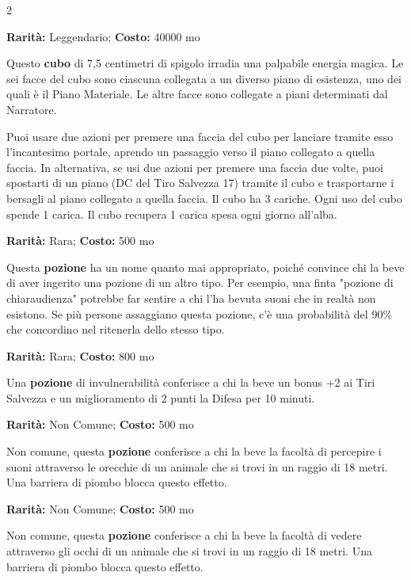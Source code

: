 \begin{multicols}{2}

\textbf{Rarità:} Leggendario; \textbf{Costo:} 40000 mo

Questo \textbf{cubo} di 7,5 centimetri di spigolo irradia una palpabile energia magica. Le sei facce del cubo sono ciascuna collegata a un diverso piano di esistenza, uno dei quali è il Piano Materiale. Le altre facce sono collegate a piani determinati dal Narratore.

Puoi usare due azioni per premere una faccia del cubo per lanciare tramite esso l'incantesimo portale, aprendo un passaggio verso il piano collegato a quella faccia. In alternativa, se usi due azioni per premere una faccia due volte, puoi spostarti di un piano (DC del Tiro Salvezza 17) tramite il cubo e trasportarne i bersagli al piano collegato a quella faccia. Il cubo ha 3 cariche. Ogni uso del cubo spende 1 carica. Il cubo recupera 1 carica spesa ogni giorno all'alba.


\textbf{Rarità:} Rara; \textbf{Costo:} 500 mo

Questa \textbf{pozione} ha un nome quanto mai appropriato, poiché convince chi la beve di aver ingerito una pozione di un altro tipo. Per esempio, una finta "pozione di chiaraudienza" potrebbe far sentire a chi l'ha bevuta suoni che in realtà non esistono. Se più persone assaggiano questa pozione, c'è una probabilità del 90\% che concordino nel ritenerla dello stesso tipo.


\textbf{Rarità:} Rara; \textbf{Costo:} 800 mo

Una \textbf{pozione} di invulnerabilità conferisce a chi la beve un bonus +2 ai Tiri Salvezza e un miglioramento di 2 punti la Difesa per 10 minuti.


\textbf{Rarità:} Non Comune; \textbf{Costo:} 500 mo

Non comune, questa \textbf{pozione} conferisce a chi la beve la facoltà di percepire i suoni attraverso le orecchie di un animale che si trovi in un raggio di 18 metri. Una barriera di piombo blocca questo effetto.


\textbf{Rarità:} Non Comune; \textbf{Costo:} 500 mo

Non comune, questa \textbf{pozione} conferisce a chi la beve la facoltà di vedere attraverso gli occhi di un animale che si trovi in un raggio di 18 metri. Una barriera di piombo blocca questo effetto.


\end{multicols}
